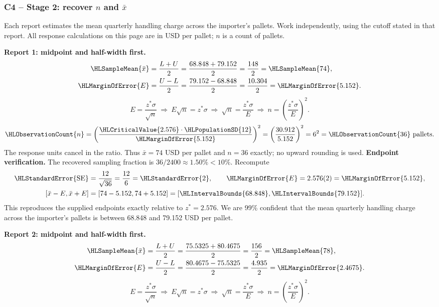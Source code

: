 \subsubsection*{C4 -- Stage 2: recover $n$ and $\bar x$}\label{sol:c4-2-b}
Each report estimates the mean quarterly handling charge across the importer's pallets. Work independently, using the cutoff stated in that report. All response calculations on this page are in USD per pallet; $n$ is a count of pallets.
\par\noindent\textbf{Report 1: midpoint and half-width first.}
\[\begin{aligned}
\HLSampleMean{\bar x}&=\frac{L+U}{2}=\frac{68.848+79.152}{2}=\frac{148}{2}=\HLSampleMean{74},\\
\HLMarginOfError{E}&=\frac{U-L}{2}=\frac{79.152-68.848}{2}=\frac{10.304}{2}=\HLMarginOfError{5.152}.
\end{aligned}\]
\[E=\frac{z^*\sigma}{\sqrt n}\ \Longrightarrow\ E\sqrt n=z^*\sigma\ \Longrightarrow\ \sqrt n=\frac{z^*\sigma}{E}\ \Longrightarrow\ n=\left(\frac{z^*\sigma}{E}\right)^2.\]
\[\HLObservationCount{n}=\left(\frac{\HLCriticalValue{2.576}\cdot\HLPopulationSD{12}}{\HLMarginOfError{5.152}}\right)^2=\left(\frac{30.912}{5.152}\right)^2=6^2=\HLObservationCount{36}\text{ pallets}.\]
The response units cancel in the ratio. Thus $\bar x=74$ USD per pallet and $n=36$ exactly; no upward rounding is used.
\textbf{Endpoint verification.} The recovered sampling fraction is $36/2400\approx 1.50\%<10\%$. Recompute
\[\begin{aligned}
\HLStandardError{\mathrm{SE}}&=\frac{12}{\sqrt{36}}=\frac{12}{6}=\HLStandardError{2},\qquad \HLMarginOfError{E}=2.576(2)=\HLMarginOfError{5.152},\\
[\bar x-E,\bar x+E]&=[74-5.152,74+5.152]=[\HLIntervalBounds{68.848},\HLIntervalBounds{79.152}].
\end{aligned}\]
This reproduces the supplied endpoints exactly relative to $z^*=2.576$. We are 99\% confident that the mean quarterly handling charge across the importer's pallets is between 68.848 and 79.152 USD per pallet.
\par\noindent\textbf{Report 2: midpoint and half-width first.}
\[\begin{aligned}
\HLSampleMean{\bar x}&=\frac{L+U}{2}=\frac{75.5325+80.4675}{2}=\frac{156}{2}=\HLSampleMean{78},\\
\HLMarginOfError{E}&=\frac{U-L}{2}=\frac{80.4675-75.5325}{2}=\frac{4.935}{2}=\HLMarginOfError{2.4675}.
\end{aligned}\]
\[E=\frac{z^*\sigma}{\sqrt n}\ \Longrightarrow\ E\sqrt n=z^*\sigma\ \Longrightarrow\ \sqrt n=\frac{z^*\sigma}{E}\ \Longrightarrow\ n=\left(\frac{z^*\sigma}{E}\right)^2.\]
